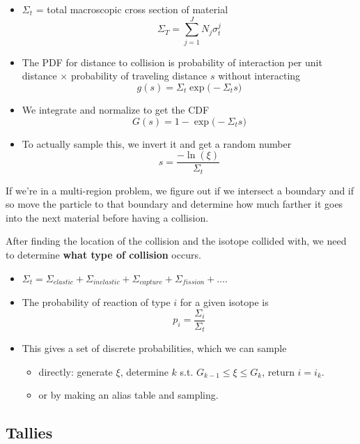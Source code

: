 \documentclass[12pt]{article}
\begin{document}
\begin{itemize}
\item $\Sigma_t$ = total macroscopic cross section of material
\[\Sigma_T = \sum_{j=1}^J N_j \sigma_t^j\]

\item The PDF for distance to collision is probability of interaction per unit distance $\times$ probability of traveling distance $s$ without interacting
\[g(s) = \Sigma_t \exp\bigl(-\Sigma_t s \bigr)\]

\item We integrate and normalize to get the CDF
\[G(s) = 1 - \exp\bigl(-\Sigma_t s \bigr)\]

\item To actually sample this, we invert it and get a random number
\[s = \frac{-\ln(\xi)}{\Sigma_t}\]
\end{itemize}
%
If we're in a multi-region problem, we figure out if we intersect a boundary and if so move the particle to that boundary and determine how much farther it goes into the next material before having a collision.

After finding the location of the collision and the isotope collided with, we need to determine \textbf{what type of collision} occurs. 

\begin{itemize}
\item $\Sigma_t = \Sigma_{elastic} + \Sigma_{inelastic} + \Sigma_{capture} + \Sigma_{fission} + \dots$.

\item The probability of reaction of type $i$ for a given isotope is 
\[p_i = \frac{\Sigma_i}{\Sigma_t}\]

\item This gives a set of discrete probabilities, which we can sample 
\begin{itemize}
\item directly: generate $\xi$, determine $k$ s.t. $G_{k-1} \leq \xi \le G_k$, return $i = i_k$.

\item or by making an alias table and sampling.
\end{itemize}

\end{itemize}


\subsection*{Tallies}
\end{document}
